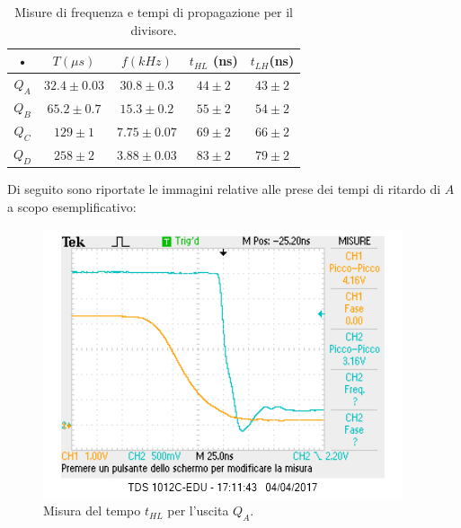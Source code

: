 \documentclass[10pt,a4paper]{article}
\begin{document}

\begin{table}[!htb]
\centering
\begin{tabular}{|c|c|c|c|c|}
\hline 
• & $T (\mu s)$ & $f (kHz)$ & $t_{HL}$ (ns) & $t_{LH}$(ns) \\ 
\hline 
$Q_A$ & $32.4 \pm 0.03$ & $30.8 \pm 0.3$ & $44 \pm 2$ & $43 \pm 2$ \\ 
\hline 
$Q_B$ & $65.2 \pm 0.7$ & $15.3 \pm 0.2$ & $55 \pm 2$ & $54 \pm 2$ \\ 
\hline 
$Q_C$ & $129 \pm 1$ & $7.75 \pm 0.07$ & $69 \pm 2$ & $66 \pm 2$ \\ 
\hline 
$Q_D$ & $258 \pm 2$ & $3.88 \pm 0.03$ & $83 \pm 2$ & $79 \pm 2$ \\ 
\hline 
\end{tabular} 
\caption{Misure di frequenza e tempi di propagazione per il divisore. \label{misureDivisore}}
\end{table}

Di seguito sono riportate le immagini relative alle prese dei tempi di ritardo di $A$ a scopo esemplificativo:

\begin{figure}
\centering
\includegraphics[scale=1.0]{tphlQA.png}
\caption{Misura del tempo $t_{HL}$ per l'uscita $Q_A$.\label{qa1}}
\end{figure}
\end{document}

